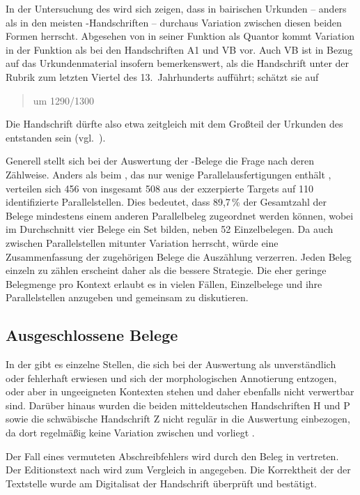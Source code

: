 In der Untersuchung des \CAO{} wird sich zeigen, dass in
bairischen Urkunden -- anders als in den meisten
\KC{}-Handschriften -- durchaus Variation zwischen diesen beiden Formen
herrscht. Abgesehen von  in seiner Funktion als Quantor kommt
Variation in der Funktion als  bei den Handschriften A1 und VB
vor. Auch VB ist in Bezug auf das Urkundenmaterial insofern bemerkenswert, als
\citet[224]{schneider1987} die Handschrift unter der Rubrik zum letzten Viertel
des 13.~Jahrhunderts aufführt; \citet[65]{wolf:kckat} schätzt sie auf
\blockquote{um 1290/1300}. Die Handschrift dürfte also etwa
zeitgleich mit dem Großteil der Urkunden des \CAO{} entstanden sein
(vgl.~).

Generell stellt sich bei der Auswertung der \KC{}-Belege die Frage nach deren
Zählweise. Anders als beim \CAO{}, das nur wenige
Parallelausfertigungen enthält
\autocite[vgl.][326--328]{ganslmayeretal2003}, verteilen sich 456 von insgesamt
508 aus der \KC{} exzerpierte Targets auf 110 identifizierte
Parallelstellen. Dies bedeutet, dass 89,7\,\% der Gesamtzahl der Belege
mindestens einem anderen Parallelbeleg zugeordnet werden können, wobei im
Durchschnitt vier Belege ein Set bilden, neben 52 Einzelbelegen. Da auch
zwischen Parallelstellen mitunter Variation herrscht, würde eine
Zusammenfassung der zugehörigen Belege die Auszählung verzerren. Jeden Beleg
einzeln zu zählen erscheint daher als die bessere Strategie. Die eher geringe
Belegmenge pro Kontext erlaubt es in vielen Fällen, Einzelbelege und ihre
Parallelstellen anzugeben und gemeinsam zu diskutieren.

\subsection{Ausgeschlossene Belege}
\label{subsec:ausgeschlossene_kc}

In der \KC{} gibt es einzelne Stellen, die sich bei der Auswertung als
unverständlich oder fehlerhaft erwiesen und sich der morphologischen
Annotierung entzogen, oder aber in ungeeigneten Kontexten stehen und daher
ebenfalls nicht verwertbar sind. Darüber hinaus wurden die beiden
mitteldeutschen Handschriften H und P sowie die
schwäbische Handschrift Z nicht regulär in die Auswertung
einbezogen, da dort regelmäßig keine Variation zwischen  und
 vorliegt \autocite[vgl. auch][183]{ksw2}.

Der Fall eines vermuteten Abschreibfehlers wird durch den Beleg in
 vertreten. Der Editionstext nach \citet{schroeder1895}
wird zum Vergleich in  angegeben. Die Korrektheit der
 der Textstelle wurde am Digitalisat der
Handschrift überprüft und bestätigt.

